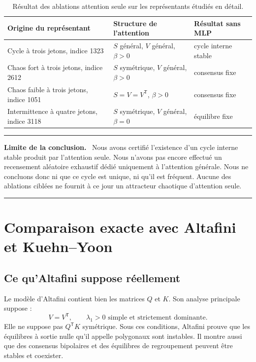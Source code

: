\documentclass[11pt,a4paper]{article}
\theoremstyle{definition}
\newcommand{\T}{\mathsf T}
\newenvironment{limitbox}
{\begin{center}\begin{minipage}{0.92\textwidth}\color{deeporange}\hrule\vspace{0.45em}\small\textbf{Limite de la conclusion.}\ \color{black}}
{\vspace{0.35em}\color{deeporange}\hrule\color{black}\end{minipage}\end{center}}
\begin{document}
\begin{table}[ht]
\centering
\caption{Résultat des ablations attention seule sur les représentants étudiés en détail.}
\label{tab:ablations}
\begin{tabularx}{\textwidth}{@{}lXl@{}}
\toprule
Origine du représentant & Structure de l'attention & Résultat sans MLP \\
\midrule
Cycle à trois jetons, indice 1323 & $S$ général, $V$ général, $\beta>0$ & cycle interne stable \\
Chaos fort à trois jetons, indice 2612 & $S$ symétrique, $V$ général, $\beta>0$ & consensus fixe \\
Chaos faible à trois jetons, indice 1051 & $S=V=V^{\T}$, $\beta>0$ & consensus fixe \\
Intermittence à quatre jetons, indice 3118 & $S$ symétrique, $V$ général, $\beta=0$ & équilibre fixe \\
\bottomrule
\end{tabularx}
\end{table}

\begin{limitbox}
Nous avons certifié l'existence d'un cycle interne stable produit par l'attention seule.
Nous n'avons pas encore effectué un recensement aléatoire exhaustif dédié uniquement à
l'attention générale. Nous ne concluons donc ni que ce cycle est unique, ni qu'il est
fréquent. Aucune des ablations ciblées ne fournit à ce jour un attracteur chaotique
d'attention seule.
\end{limitbox}

\section{Comparaison exacte avec Altafini et Kuehn--Yoon}
\label{sec:comparison}

\subsection{Ce qu'Altafini suppose réellement}

Le modèle d'Altafini contient bien les matrices $Q$ et $K$. Son analyse principale
suppose :
\begin{equation}
 V=V^{\T},\qquad \lambda_1>0\text{ simple et strictement dominante}.  \label{eq:altafini-assumption}
\end{equation}
Elle ne suppose pas $Q^{\T}K$ symétrique. Sous ces conditions, Altafini prouve que les
équilibres à sortie nulle qu'il appelle polygonaux sont instables. Il montre aussi que des
consensus bipolaires et des équilibres de regroupement peuvent être stables et coexister.
\end{document}
